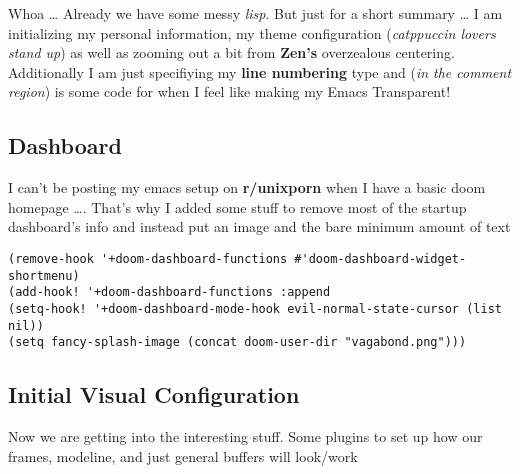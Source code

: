 \documentclass[11pt]{article}
\begin{document}
Whoa \ldots{} Already we have some messy \emph{lisp}. But just for a short summary \ldots{} I am initializing my personal information, my theme configuration (\emph{catppuccin lovers stand up}) as well as zooming out a bit from \textbf{Zen's} overzealous centering. Additionally I am just specifiying my \textbf{line numbering} type and (\emph{in the comment region}) is some code for when I feel like making my Emacs Transparent!

\subsection{Dashboard}
\label{sec:org80c1d8b}
I can't be posting my emacs setup on \textbf{r/unixporn} when I have a basic doom homepage \ldots{}. That's why I added some stuff to remove most of the startup dashboard's info and instead put an image and the bare minimum amount of text
\begin{verbatim}
(remove-hook '+doom-dashboard-functions #'doom-dashboard-widget-shortmenu)
(add-hook! '+doom-dashboard-functions :append
(setq-hook! '+doom-dashboard-mode-hook evil-normal-state-cursor (list nil))
(setq fancy-splash-image (concat doom-user-dir "vagabond.png")))
\end{verbatim}

\subsection{Initial Visual Configuration}
\label{sec:org38bba67}
Now we are getting into the interesting stuff. Some plugins to set up how our frames, modeline, and just general buffers will look/work
\end{document}

